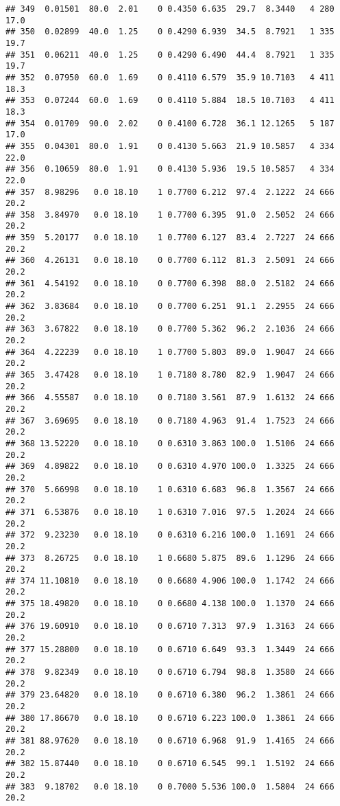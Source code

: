 \documentclass[]{article}
\begin{document}
\begin{verbatim}
## 349  0.01501  80.0  2.01    0 0.4350 6.635  29.7  8.3440   4 280    17.0
## 350  0.02899  40.0  1.25    0 0.4290 6.939  34.5  8.7921   1 335    19.7
## 351  0.06211  40.0  1.25    0 0.4290 6.490  44.4  8.7921   1 335    19.7
## 352  0.07950  60.0  1.69    0 0.4110 6.579  35.9 10.7103   4 411    18.3
## 353  0.07244  60.0  1.69    0 0.4110 5.884  18.5 10.7103   4 411    18.3
## 354  0.01709  90.0  2.02    0 0.4100 6.728  36.1 12.1265   5 187    17.0
## 355  0.04301  80.0  1.91    0 0.4130 5.663  21.9 10.5857   4 334    22.0
## 356  0.10659  80.0  1.91    0 0.4130 5.936  19.5 10.5857   4 334    22.0
## 357  8.98296   0.0 18.10    1 0.7700 6.212  97.4  2.1222  24 666    20.2
## 358  3.84970   0.0 18.10    1 0.7700 6.395  91.0  2.5052  24 666    20.2
## 359  5.20177   0.0 18.10    1 0.7700 6.127  83.4  2.7227  24 666    20.2
## 360  4.26131   0.0 18.10    0 0.7700 6.112  81.3  2.5091  24 666    20.2
## 361  4.54192   0.0 18.10    0 0.7700 6.398  88.0  2.5182  24 666    20.2
## 362  3.83684   0.0 18.10    0 0.7700 6.251  91.1  2.2955  24 666    20.2
## 363  3.67822   0.0 18.10    0 0.7700 5.362  96.2  2.1036  24 666    20.2
## 364  4.22239   0.0 18.10    1 0.7700 5.803  89.0  1.9047  24 666    20.2
## 365  3.47428   0.0 18.10    1 0.7180 8.780  82.9  1.9047  24 666    20.2
## 366  4.55587   0.0 18.10    0 0.7180 3.561  87.9  1.6132  24 666    20.2
## 367  3.69695   0.0 18.10    0 0.7180 4.963  91.4  1.7523  24 666    20.2
## 368 13.52220   0.0 18.10    0 0.6310 3.863 100.0  1.5106  24 666    20.2
## 369  4.89822   0.0 18.10    0 0.6310 4.970 100.0  1.3325  24 666    20.2
## 370  5.66998   0.0 18.10    1 0.6310 6.683  96.8  1.3567  24 666    20.2
## 371  6.53876   0.0 18.10    1 0.6310 7.016  97.5  1.2024  24 666    20.2
## 372  9.23230   0.0 18.10    0 0.6310 6.216 100.0  1.1691  24 666    20.2
## 373  8.26725   0.0 18.10    1 0.6680 5.875  89.6  1.1296  24 666    20.2
## 374 11.10810   0.0 18.10    0 0.6680 4.906 100.0  1.1742  24 666    20.2
## 375 18.49820   0.0 18.10    0 0.6680 4.138 100.0  1.1370  24 666    20.2
## 376 19.60910   0.0 18.10    0 0.6710 7.313  97.9  1.3163  24 666    20.2
## 377 15.28800   0.0 18.10    0 0.6710 6.649  93.3  1.3449  24 666    20.2
## 378  9.82349   0.0 18.10    0 0.6710 6.794  98.8  1.3580  24 666    20.2
## 379 23.64820   0.0 18.10    0 0.6710 6.380  96.2  1.3861  24 666    20.2
## 380 17.86670   0.0 18.10    0 0.6710 6.223 100.0  1.3861  24 666    20.2
## 381 88.97620   0.0 18.10    0 0.6710 6.968  91.9  1.4165  24 666    20.2
## 382 15.87440   0.0 18.10    0 0.6710 6.545  99.1  1.5192  24 666    20.2
## 383  9.18702   0.0 18.10    0 0.7000 5.536 100.0  1.5804  24 666    20.2

\end{verbatim}
\end{document}
